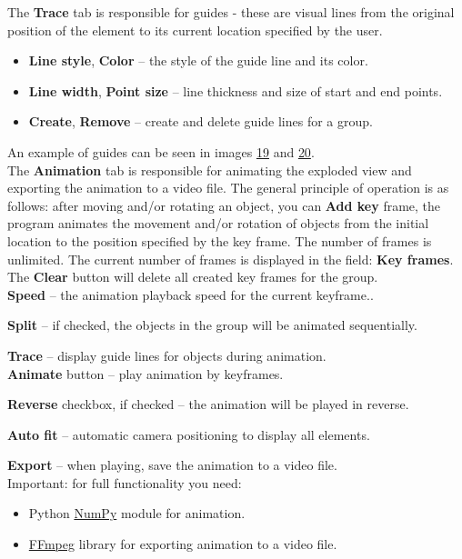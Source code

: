 \documentclass[a4paper,12pt]{article}
\begin{document}
\pagebreak




The \textbf{Trace} tab is responsible for guides - these are visual lines from the original position of the element to its current location specified by the user.
\begin{itemize}
	\item \textbf{Line style}, \textbf{Color} -- the style of the guide line and its color.
	\item \textbf{Line width}, \textbf{Point size} -- line thickness and size of start and end points.
	\item \textbf{Create}, \textbf{Remove} -- create and delete guide lines for a group.
\end{itemize}
An example of guides can be seen in images \hyperref[sec:exploded_m_result]{19} and \hyperref[sec:exploded_d_result]{20}.\\

The \textbf{Animation} tab is responsible for animating the exploded view and exporting the animation to a video file. The general principle of operation is as follows: after moving and/or rotating an object, you can \textbf{Add key} frame, the program animates the movement and/or rotation of objects from the initial location to the position specified by the key frame. The number of frames is unlimited. The current number of frames is displayed in the field: \textbf{Key frames}. The \textbf{Clear} button will delete all created key frames for the group.\\

\textbf{Speed} -- the animation playback speed for the current keyframe..

\textbf{Split} -- if checked, the objects in the group will be animated sequentially.

\textbf{Trace} -- display guide lines for objects during animation.\\

\textbf{Animate} button -- play animation by keyframes.

\textbf{Reverse} checkbox, if checked -- the animation will be played in reverse.

\textbf{Auto fit} -- automatic camera positioning to display all elements.

\textbf{Export} -- when playing, save the animation to a video file.\\

Important: for full functionality you need:
\begin{itemize}
	\item Python \href{https://pypi.org/project/numpy}{NumPy} module for animation.
	\item \href{https://www.ffmpeg.org}{FFmpeg} library for exporting animation to a video file.
\end{itemize}
\end{document}
